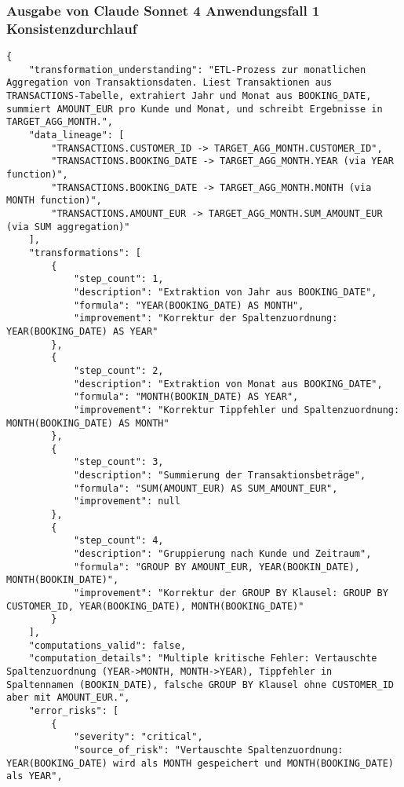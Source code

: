 \subsubsection{Ausgabe von Claude Sonnet 4 Anwendungsfall 1 Konsistenzdurchlauf}\label{anhang:subsubsec:claude_case1_prompt2}
\begin{lstlisting}[caption={Ausgabe: Claude Sonnet 4 Anwendungsfall 1 Konsistenzdurchlauf},label={claude_case1_prompt2}]
{
    "transformation_understanding": "ETL-Prozess zur monatlichen Aggregation von Transaktionsdaten. Liest Transaktionen aus TRANSACTIONS-Tabelle, extrahiert Jahr und Monat aus BOOKING_DATE, summiert AMOUNT_EUR pro Kunde und Monat, und schreibt Ergebnisse in TARGET_AGG_MONTH.",
    "data_lineage": [
        "TRANSACTIONS.CUSTOMER_ID -> TARGET_AGG_MONTH.CUSTOMER_ID",
        "TRANSACTIONS.BOOKING_DATE -> TARGET_AGG_MONTH.YEAR (via YEAR function)",
        "TRANSACTIONS.BOOKING_DATE -> TARGET_AGG_MONTH.MONTH (via MONTH function)",
        "TRANSACTIONS.AMOUNT_EUR -> TARGET_AGG_MONTH.SUM_AMOUNT_EUR (via SUM aggregation)"
    ],
    "transformations": [
        {
            "step_count": 1,
            "description": "Extraktion von Jahr aus BOOKING_DATE",
            "formula": "YEAR(BOOKING_DATE) AS MONTH",
            "improvement": "Korrektur der Spaltenzuordnung: YEAR(BOOKING_DATE) AS YEAR"
        },
        {
            "step_count": 2,
            "description": "Extraktion von Monat aus BOOKING_DATE",
            "formula": "MONTH(BOOKIN_DATE) AS YEAR",
            "improvement": "Korrektur Tippfehler und Spaltenzuordnung: MONTH(BOOKING_DATE) AS MONTH"
        },
        {
            "step_count": 3,
            "description": "Summierung der Transaktionsbeträge",
            "formula": "SUM(AMOUNT_EUR) AS SUM_AMOUNT_EUR",
            "improvement": null
        },
        {
            "step_count": 4,
            "description": "Gruppierung nach Kunde und Zeitraum",
            "formula": "GROUP BY AMOUNT_EUR, YEAR(BOOKIN_DATE), MONTH(BOOKIN_DATE)",
            "improvement": "Korrektur der GROUP BY Klausel: GROUP BY CUSTOMER_ID, YEAR(BOOKING_DATE), MONTH(BOOKING_DATE)"
        }
    ],
    "computations_valid": false,
    "computation_details": "Multiple kritische Fehler: Vertauschte Spaltenzuordnung (YEAR->MONTH, MONTH->YEAR), Tippfehler in Spaltennamen (BOOKIN_DATE), falsche GROUP BY Klausel ohne CUSTOMER_ID aber mit AMOUNT_EUR.",
    "error_risks": [
        {
            "severity": "critical",
            "source_of_risk": "Vertauschte Spaltenzuordnung: YEAR(BOOKING_DATE) wird als MONTH gespeichert und MONTH(BOOKING_DATE) als YEAR",

\end{lstlisting}
